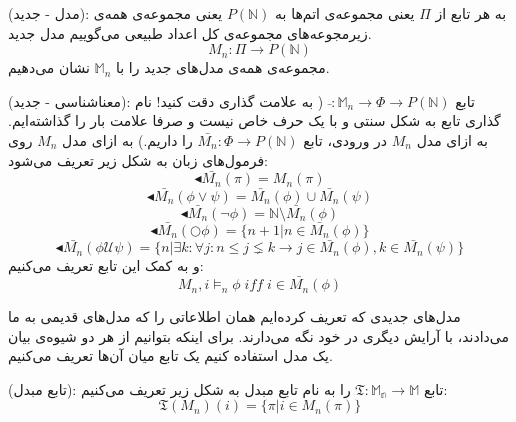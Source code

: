 \begin{defn}
	(مدل - جدید): به هر تابع از $\Pi$ یعنی مجموعه‌ی اتم‌ها به $\mathit{P(\mathbb{N})}$ یعنی مجموعه‌ی همه‌ی زیرمجوعه‌های مجموعه‌ی کل اعداد طبیعی می‌گوییم مدل جدید.
	$$M_n:\Pi \rightarrow \mathit{P(\mathbb{N})}$$
	مجموعه‌ی همه‌ی مدل‌های جدید را با 
	$\mathbb{M}_n$
	نشان می‌دهیم.
\end{defn}

\begin{defn}
	(معناشناسی - جدید): تابع 
	$\bar{ }:\mathbb{M}_n \rightarrow \Phi \rightarrow \mathit{P}(\mathbb{N})$
	( به علامت گذاری دقت کنید! نام گذاری تابع به شکل سنتی و با یک حرف خاص نیست و صرفا علامت بار را گذاشته‌ایم. به ازای مدل $M_n$ در ورودی، تابع 
	$\bar{M_n}: \Phi \rightarrow \mathit{P}(\mathbb{N})$
	را داریم.)
	به ازای مدل $M_n$ روی فرمول‌های زبان  به شکل زیر تعریف می‌شود:
	$$\blacktriangleleft \bar{M_n}(\pi)= M_n(\pi)$$
	$$\blacktriangleleft \bar{M_n}(\phi \lor \psi)= \bar{M_n}(\phi) \cup \bar{M_n}(\psi)$$
	$$\blacktriangleleft \bar{M_n}(\neg \phi)= \mathbb{N} \setminus \bar{M_n}(\phi)$$
	$$\blacktriangleleft \bar{M_n}(\bigcirc\phi)= \{n+1|n\in \bar{M_n}(\phi) \}$$
	$$\blacktriangleleft \bar{M_n}(\phi \mathcal{U} \psi)= \{n|\exists k : \forall j: n \leq j \lneq k \rightarrow j \in \bar{M_n}(\phi) , k \in \bar{M_n}(\psi) \}$$
	و به کمک این تابع تعریف می‌کنیم:
	$$M_n,i \models_n \phi \; \mathit{iff}\; i \in \bar{M_n}(\phi)$$
\end{defn}

مدل‌های جدیدی که تعریف کرده‌ایم همان اطلاعاتی را که مدل‌های قدیمی به ما می‌دادند، با آرایش دیگری در خود نگه می‌دارند. برای اینکه بتوانیم از هر دو شیوه‌ی بیان یک مدل استفاده کنیم یک تابع میان آن‌ها تعریف می‌کنیم.

\begin{defn}
	(تابع مبدل): تابع
	$\mathfrak{T}:\mathbb{M_n} \rightarrow \mathbb{M}$
	را به نام تابع مبدل به شکل زیر تعریف می‌کنیم:
	$$\mathfrak{T}(M_n)(i)=\{ \pi | i \in M_n(\pi) \}$$
\end{defn} 

